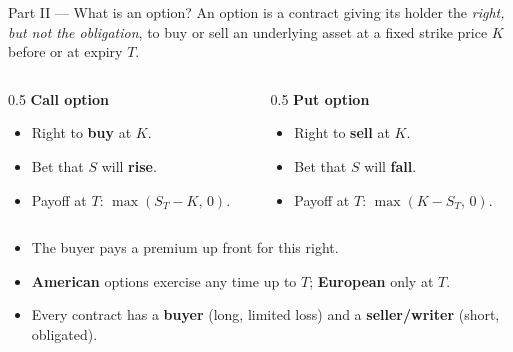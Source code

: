 \documentclass[11pt,aspectratio=169]{beamer}
\newcommand{\strike}{K}
\newcommand{\und}{S}                         %
\begin{document}
\begin{frame}{Part II — What is an option?}
  An \alert{option} is a contract giving its holder the \emph{right, but
  not the obligation}, to buy or sell an underlying asset at a fixed
  \alert{strike} price $\strike$ before or at \alert{expiry} $T$.
  \vspace{0.6em}
  \begin{columns}[T]
    \begin{column}{0.5\textwidth}
      \textbf{Call option}
      \begin{itemize}
        \item Right to \textbf{buy} at $\strike$.
        \item Bet that $\und$ will \textbf{rise}.
        \item Payoff at $T$: $\max(\und_T-\strike,\,0)$.
      \end{itemize}
    \end{column}
    \begin{column}{0.5\textwidth}
      \textbf{Put option}
      \begin{itemize}
        \item Right to \textbf{sell} at $\strike$.
        \item Bet that $\und$ will \textbf{fall}.
        \item Payoff at $T$: $\max(\strike-\und_T,\,0)$.
      \end{itemize}
    \end{column}
  \end{columns}
  \vspace{0.5em}
  \begin{itemize}
    \item The buyer pays a \alert{premium} up front for this right.
    \item \textbf{American} options exercise any time up to $T$; \textbf{European} only at $T$.
    \item Every contract has a \textbf{buyer} (long, limited loss) and a \textbf{seller/writer} (short, obligated).
  \end{itemize}
\end{frame}
\end{document}
